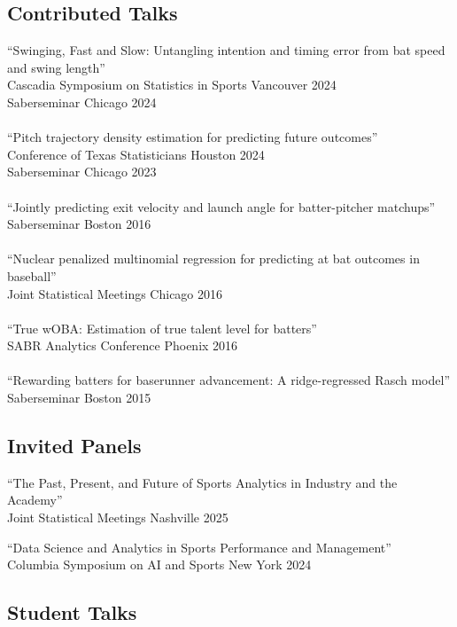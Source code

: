 \documentclass{article}
\begin{document}
\subsection*{\sc Contributed Talks}

``Swinging, Fast and Slow: Untangling intention and timing error from bat speed and swing length''\\
Cascadia Symposium on Statistics in Sports \hfill Vancouver 2024\\
Saberseminar \hfill Chicago 2024\\
~\\
``Pitch trajectory density estimation for predicting future outcomes''\\
Conference of Texas Statisticians \hfill Houston 2024\\
Saberseminar \hfill Chicago 2023\\
~\\
``Jointly predicting exit velocity and launch angle for batter-pitcher matchups''\\
Saberseminar \hfill Boston 2016\\
~\\
``Nuclear penalized multinomial regression for predicting at bat outcomes in baseball''\\
Joint Statistical Meetings \hfill Chicago 2016\\
~\\
``True wOBA: Estimation of true talent level for batters''\\
SABR Analytics Conference \hfill Phoenix 2016\\
~\\
``Rewarding batters for baserunner advancement: A ridge-regressed Rasch model''\\
Saberseminar \hfill Boston 2015

\subsection*{\sc Invited Panels}

``The Past, Present, and Future of Sports Analytics in Industry and the Academy''\\
Joint Statistical Meetings \hfill Nashville 2025

``Data Science and Analytics in Sports Performance and Management''\\
Columbia Symposium on AI and Sports \hfill New York 2024

\subsection*{\sc Student Talks}
\end{document}
